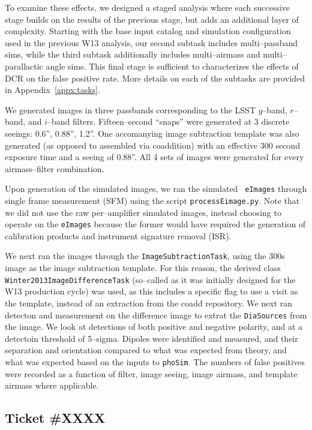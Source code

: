 \documentclass[prd, nofootinbib, floatfix, 11pt, tightenlines, times]{article}
\begin{document}
To examine these effects, we designed a staged analysis where each
successive stage builds on the results of the previous stage, but adds
an additional layer of complexity.  Starting with the base input
catalog and simulation configuration used in the previous W13
analysis, our second subtask includes multi--passband sims, while the
third subtask additionally includes multi--airmass and
multi--parallactic angle sims.  This final stage is sufficient to
characterizes the effects of DCR on the false positive rate.  More
details on each of the subtasks are provided in
Appendix~\ref{appx:tasks}.

We generated images in three passbands corresponding to the LSST
$g$--band, $r$--band, and $i$--band filters.  Fifteen--second
``snaps'' were generated at 3 discrete seeings: 0.6'', 0.88'', 1.2''.
One accomanying image subtraction template was also generated (as
opposed to assembled via coaddition) with an effective 300 second
exposure time and a seeing of 0.88''.  All 4 sets of images were
generated for every airmass--filter combination.

Upon generation of the simulated images, we ran the simulated {\tt
  eImages} through single frame measurement (SFM) using the script
{\tt processEimage.py}.  Note that we did not use the raw
per--amplifier simulated images, instead choosing to operate on the
{\tt eImages} because the former would have required the generation of
calibration products and instrument signature removal (ISR).  

We next ran the images through the {\tt ImageSubtractionTask}, using
the 300s image as the image subtraction template.  For this reason,
the derived class {\tt Winter2013ImageDifferenceTask} (so--called as
it was initially designed for the W13 production cycle) was used, as
this includes a specific flag to use a visit as the template, instead
of an extraction from the coadd repository.  We next ran detecton and
measurement on the difference image to extrat the {\tt DiaSources}
from the image.  We look at detections of both positive and negative
polarity, and at a detectoin threshold of 5--sigma.  Dipoles were
identified and measured, and their separation and orientation compared
to what was expected from theory, and what was expected based on the
inputs to {\tt phoSim}.  The numbers of false positives were recorded
as a function of filter, image seeing, image airmass, and template
airmass where applicable.

\subsection{Ticket #XXXX}
\end{document}

